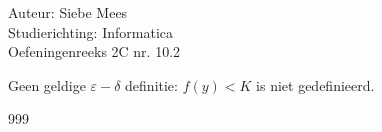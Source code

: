 \documentclass[a4paper]{article}
\begin{document}
  
\noindent \large Auteur: Siebe Mees \\
\noindent \large Studierichting: Informatica\\
\noindent \large Oefeningenreeks 2C nr. 10.2\\

\medskip

\normalsize

Geen geldige $\varepsilon-\delta$ definitie: $ f(y) < K $ is niet gedefinieerd.\\

\begin{thebibliography}{999}
\end{thebibliography}
\end{document}
